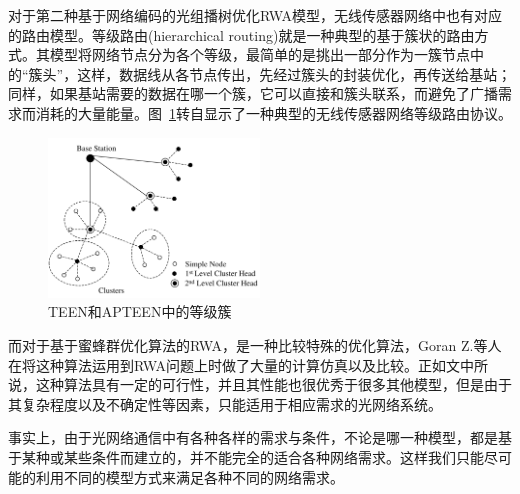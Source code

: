 \documentclass[11pt,twocolumn]{ctexart}
\begin{document}
对于第二种基于网络编码的光组播树优化RWA模型，无线传感器网络中也有对应的路由模型。等级路由(hierarchical routing)就是一种典型的基于簇状的路由方式。其模型将网络节点分为各个等级，最简单的是挑出一部分作为一簇节点中的“簇头”，这样，数据线从各节点传出，先经过簇头的封装优化，再传送给基站；同样，如果基站需要的数据在哪一个簇，它可以直接和簇头联系，而避免了广播需求而消耗的大量能量。图~\ref{TEEN}转自\cite{11}显示了一种典型的无线传感器网络等级路由协议。
\begin{figure}[!hbtp]
  \begin{center}
  \includegraphics[width=0.5\textwidth]{TEEN}
  \end{center}
  \caption{TEEN和APTEEN中的等级簇}
  \label{TEEN}
\end{figure}

而对于基于蜜蜂群优化算法的RWA，是一种比较特殊的优化算法，Goran Z.等人在将这种算法运用到RWA问题上时做了大量的计算仿真以及比较\cite{6}。正如文中所说，这种算法具有一定的可行性，并且其性能也很优秀于很多其他模型，但是由于其复杂程度以及不确定性等因素，只能适用于相应需求的光网络系统。

事实上，由于光网络通信中有各种各样的需求与条件，不论是哪一种模型，都是基于某种或某些条件而建立的，并不能完全的适合各种网络需求。这样我们只能尽可能的利用不同的模型方式来满足各种不同的网络需求。




\end{document}
